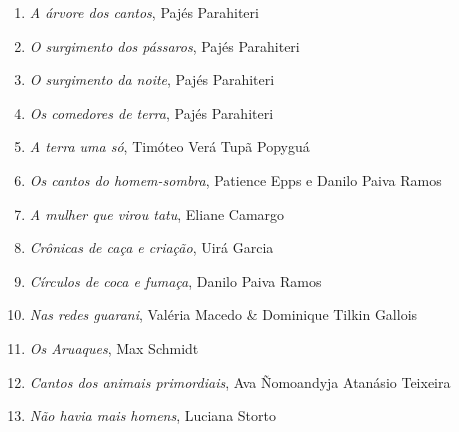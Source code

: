 \begin{enumerate}
\setlength\parskip{4.2pt}
\setlength\itemsep{-1.4mm}
\item \textit{A árvore dos cantos}, Pajés Parahiteri
\item \textit{O surgimento dos pássaros}, Pajés Parahiteri
\item \textit{O surgimento da noite}, Pajés Parahiteri
\item \textit{Os comedores de terra}, Pajés Parahiteri
\item \textit{A terra uma só}, Timóteo Verá Tupã Popyguá
\item \textit{Os cantos do homem-sombra}, Patience Epps e Danilo Paiva Ramos
\item \textit{A mulher que virou tatu}, Eliane Camargo
\item \textit{Crônicas de caça e criação}, Uirá Garcia
\item \textit{Círculos de coca e fumaça}, Danilo Paiva Ramos
\item \textit{Nas redes guarani}, Valéria Macedo \& Dominique Tilkin Gallois
\item \textit{Os Aruaques}, Max Schmidt
\item \textit{Cantos dos animais primordiais}, Ava Ñomoandyja Atanásio Teixeira
\item \textit{Não havia mais homens}, Luciana Storto
\end{enumerate}





